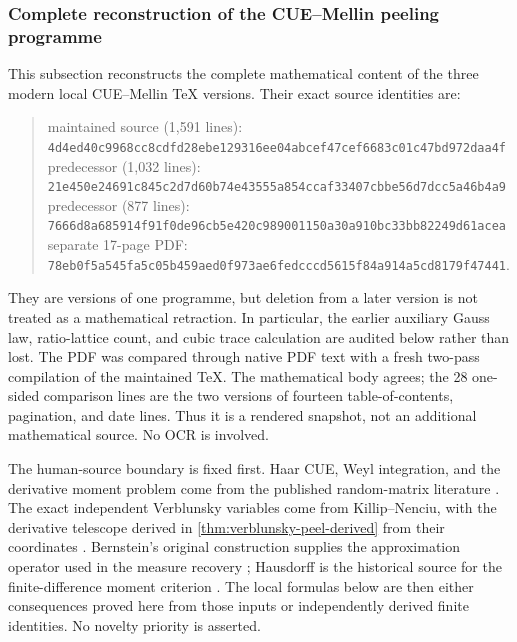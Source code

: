\subsubsection{Complete reconstruction of the CUE--Mellin peeling programme}
\label{sec:cue-mellin-complete-programme}

This subsection reconstructs the complete mathematical content of the three modern local
CUE--Mellin TeX versions.  Their exact source identities are:
\begin{quote}\small
maintained source (1,591 lines):\\
\texttt{4d4ed40c9968cc8cdfd28ebe129316ee04abcef47cef6683c01c47bd972daa4f}\\
predecessor (1,032 lines):\\
\texttt{21e450e24691c845c2d7d60b74e43555a854ccaf33407cbbe56d7dcc5a46b4a9}\\
predecessor (877 lines):\\
\texttt{7666d8a685914f91f0de96cb5e420c989001150a30a910bc33bb82249d61acea}\\
separate 17-page PDF:\\
\texttt{78eb0f5a545fa5c05b459aed0f973ae6fedcccd5615f84a914a5cd8179f47441}.
\end{quote}
They are versions of one programme, but deletion from a later version is not treated as a
mathematical retraction.  In particular, the earlier auxiliary Gauss law, ratio-lattice
count, and cubic trace calculation are audited below rather than lost.  The PDF was compared
through native PDF text with a fresh two-pass compilation of the maintained TeX.  The
mathematical body agrees; the 28 one-sided comparison lines are the two versions of fourteen
table-of-contents, pagination, and date lines.  Thus it is a rendered snapshot, not an
additional mathematical source.  No OCR is involved.

The human-source boundary is fixed first.  Haar CUE, Weyl integration, and the derivative
moment problem come from the published random-matrix literature
\cite{forrester2022,winn2012,conreyRubinsteinSnaith2006,dehaye2008,
groverMezzadriSimm2026,simmWei2026}.  The exact independent Verblunsky variables come from
Killip--Nenciu, with the derivative telescope derived in
\cref{thm:verblunsky-peel-derived} from their coordinates
\cite{killipNenciu2004}.  Bernstein's original construction supplies the approximation
operator used in the measure recovery \cite{bernstein1912}; Hausdorff is the historical
source for the finite-difference moment criterion \cite{hausdorff1921}.  The local formulas
below are then either consequences proved here from those inputs or independently derived
finite identities.  No novelty priority is asserted.

